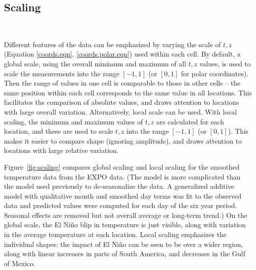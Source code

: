 \documentclass[oneside]{article}
\begin{document}
\subsection{Scaling}~\label{sec:scale}

Different features of the data can be emphasized by varying the scale of $t, z$ (Equation \ref{coords.eqn}, \ref{coords.polar.eqn}) used within each cell. By default, a global scale, using the overall minimum and maximum of all $t, z$ values, is used to scale the measurements into the range $[-1, 1]$ (or $[0, 1]$ for polar coordinates). Then the range of values in one cell is comparable to those in other cells -- the same position within each cell corresponds to the same value in all locations. This facilitates the comparison of absolute values, and draws attention to locations with large overall variation. Alternatively, local scale can be used. With local scaling, the minimum and maximum values of $t, z$ are calculated for each location, and these are used to scale $t, z$ into the range $[-1, 1]$ (or $[0, 1]$). This makes it easier to compare shape (ignoring amplitude), and draws attention to locations with large relative variation. 

Figure~\ref{fig:scaling} compares global scaling and local scaling for the smoothed temperature data from the EXPO data. (The model is more complicated than the model used previously to de-seasonalize the data. A generalized additive model \citep{wood:2006} with qualitative month and smoothed day terms was fit to the observed data and predicted values were computed for each day of the six year period. Seasonal effects are removed but not overall average or long-term trend.) On the global scale, the El Ni\~no blip in temperature is just visible, along with variation in the average temperature at each location. Local scaling emphasizes the individual shapes: the impact of El Ni\~no can be seen to be over a wider region, along with linear increases in parts of South America, and decreases in the Gulf of Mexico.
\end{document}
